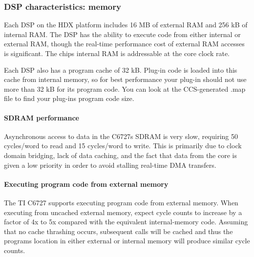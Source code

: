 \hypertarget{a00362_subsection__dsp_characteristics_memory}{}\subsubsection{D\+S\+P characteristics\+: memory}\label{a00362_subsection__dsp_characteristics_memory}
 Each D\+S\+P on the H\+D\+X platform includes 16 M\+B of external R\+A\+M and 256 k\+B of internal R\+A\+M. The D\+S\+P has the ability to execute code from either internal or external R\+A\+M, though the real-\/time performance cost of external R\+A\+M accesses is significant. The chip\textquotesingle{}s internal R\+A\+M is addressable at the core clock rate.

Each D\+S\+P also has a program cache of 32 k\+B. Plug-\/in code is loaded into this cache from internal memory, so for best performance your plug-\/in should not use more than 32 k\+B for its program code. You can look at the C\+C\+S-\/generated .map file to find your plug-\/in\textquotesingle{}s program code size.

\hypertarget{a00362_subsubsection__sdram_performance_}{}\paragraph{S\+D\+R\+A\+M performance}\label{a00362_subsubsection__sdram_performance_}
 Asynchronous access to data in the C6727\textquotesingle{}s S\+D\+R\+A\+M is very slow, requiring 50 cycles/word to read and 15 cycles/word to write. This is primarily due to clock domain bridging, lack of data caching, and the fact that data from the core is given a low priority in order to avoid stalling real-\/time D\+M\+A transfers. \hypertarget{a00362_subsubsection__executing_program_code_from_external_memory_}{}\paragraph{Executing program code from external memory}\label{a00362_subsubsection__executing_program_code_from_external_memory_}
 The T\+I C6727 supports executing program code from external memory. When executing from uncached external memory, expect cycle counts to increase by a factor of 4x to 5x compared with the equivalent internal-\/memory code. Assuming that no cache thrashing occurs, subsequent calls will be cached and thus the program\textquotesingle{}s location in either external or internal memory will produce similar cycle counts.

